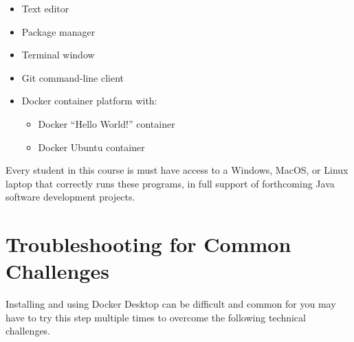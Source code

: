 \documentclass[11pt]{article}
\begin{document}
\begin{itemize}
  \setlength{\itemsep}{0pt}

  \item Text editor

  \item Package manager

  \item Terminal window

  \item Git command-line client

  \item Docker container platform with:

    \vspace*{-.1in}
    \begin{itemize}
      \setlength{\itemsep}{0pt}

      \item Docker ``Hello World!'' container
      \item Docker Ubuntu container

    \end{itemize}

\end{itemize}

\vspace*{-.1in}

Every student in this course is must have access to a Windows, MacOS, or Linux
laptop that correctly runs these programs, in full support of forthcoming Java
software development projects.

\section*{Troubleshooting for Common Challenges}

Installing and using Docker Desktop can be difficult and common for you may have
to try this step multiple times to overcome the following technical challenges.
\end{document}
